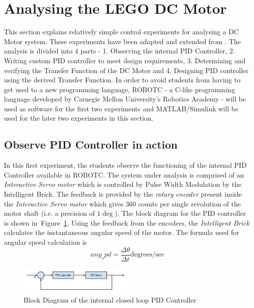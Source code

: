 \documentclass[paper=a4, fontsize=11pt]{scrartcl}
\numberwithin{equation}{section}        %
\numberwithin{figure}{section}          %
\numberwithin{table}{section}           %
\begin{document}
\section{Analysing the LEGO DC Motor}
This section explains relatively simple control experiments for analysing a DC Motor system. These experiments have been adapted and extended from \cite{ref:wadoo_jain}. The analysis is divided into 4 parts - 1. Observing the internal PID Controller, 2. Writing custom PID controller to meet design requirements, 3. Determining and verifying the Transfer Function of the DC Motor and 4. Designing PID controller using the derived Transfer Function. In order to avoid students from having to get used to a new programming language, ROBOTC - a C-like programming language developed by Carnegie Mellon University's Robotics Academy - will be used as software for the first two experiments and MATLAB/Simulink will be used for the later two experiments in this section. 

\subsection{Observe PID Controller in action}
In this first experiment, the students observe the functioning of the internal PID Controller available in ROBOTC. The system under analysis is comprised of an \emph{Interactive Servo motor} which is controlled by Pulse Width Modulation by the Intelligent Brick. The feedback is provided by the \emph{rotary encoder} present inside the \emph{Interactive Servo motor} which gives 360 counts per single revolution of the motor shaft (i.e. a precision of $1\deg$). The block diagram for the PID controller is shown in~Figure~\ref{fig:pid_block_diagram}. Using the feedback from the encoders, the \emph{Intelligent Brick} calculates the instantaneous angular speed of the motor. The formula used for angular speed calculation is
\begin{equation}
ang_spd = \frac{\Delta\theta}{\Delta{}t} \text{degrees/sec}
\end{equation}
\begin{figure}[!hbp]
	\includegraphics[width=0.5\textwidth]{pid_block_diagram}
	\caption{Block Diagram of the internal closed loop PID Controller}
	\label{fig:pid_block_diagram}
\end{figure}
\end{document}
